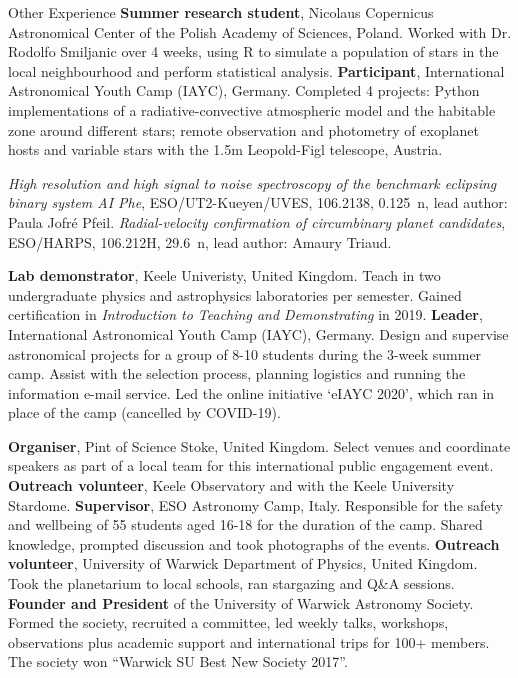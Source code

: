 \begin{rubric}{Other Experience}
\entry*[2017]%
    \textbf{Summer research student}, Nicolaus Copernicus Astronomical Center of the Polish Academy of Sciences, Poland. Worked with Dr. Rodolfo Smiljanic over 4 weeks, using R to simulate a population of stars in the local neighbourhood and perform statistical analysis.
\entry*[2014 -- 2017]%
    \textbf{Participant}, International Astronomical Youth Camp (IAYC), Germany. Completed 4 projects: Python implementations of a radiative-convective atmospheric model and the habitable zone around different stars; remote observation and photometry of exoplanet hosts and variable stars with the 1.5m Leopold-Figl telescope, Austria.
    
    
\entry*[2020]
    \textit{High resolution and high signal to noise spectroscopy of the benchmark eclipsing binary system AI Phe}, ESO/UT2-Kueyen/UVES, 106.2138, 0.125~n, lead author: Paula Jofr\'{e} Pfeil.
\entry*[2020]
    \textit{Radial-velocity confirmation of circumbinary planet candidates}, ESO/HARPS, 106.212H, 29.6~n, lead author: Amaury Triaud.

%
    \textbf{Lab demonstrator}, Keele Univeristy, United Kingdom. Teach in two undergraduate physics and astrophysics laboratories per semester. Gained certification in \emph{Introduction to Teaching and Demonstrating} in 2019.
%
    \textbf{Leader}, International Astronomical Youth Camp (IAYC), Germany. Design and supervise astronomical projects for a group of 8-10 students during the 3-week summer camp. Assist with the selection process, planning logistics and running the information e-mail service. Led the online initiative `eIAYC 2020', which ran in place of the camp (cancelled by COVID-19).

%
    \textbf{Organiser}, Pint of Science Stoke, United Kingdom. Select venues and coordinate speakers as part of a local team for this international public engagement event.
%
    \textbf{Outreach volunteer}, Keele Observatory and with the Keele University Stardome. 
\entry*[2017 -- 2019]%
    \textbf{Supervisor}, ESO Astronomy Camp, Italy. Responsible for the safety and wellbeing of 55 students aged 16-18 for the duration of the camp. Shared knowledge, prompted discussion and took photographs of the events.
\entry*[2017 -- 2018]%
    \textbf{Outreach volunteer}, University of Warwick Department of Physics, United Kingdom. Took the planetarium to local schools, ran stargazing and Q\&A sessions.
\entry*[2016 -- 2018]%
    \textbf{Founder and President} of the University of Warwick Astronomy Society. Formed the society, recruited a committee, led weekly talks, workshops, observations plus academic support and international trips for 100+ members. The society won “Warwick SU Best New Society 2017”.
\end{rubric}